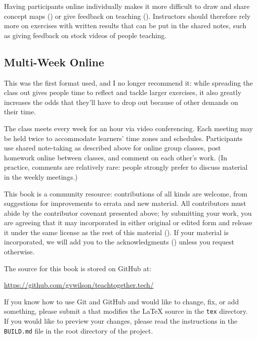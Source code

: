 Having participants online individually makes it more difficult to draw
and share concept maps () or give
feedback on teaching (). Instructors
should therefore rely more on exercises with written results that can be
put in the shared notes, such as giving feedback on stock videos of
people teaching.

\subsection*{Multi-Week Online}

This was the first format used, and I no longer recommend it: while
spreading the class out gives people time to reflect and tackle larger
exercises, it also greatly increases the odds that they'll have to drop
out because of other demands on their time.

The class meets every week for an hour via video conferencing. Each
meeting may be held twice to accommodate learners' time zones and
schedules. Participants use shared note-taking as described above for
online group classes, post homework online between classes, and comment
on each other's work. (In practice, comments are relatively rare: people
strongly prefer to discuss material in the weekly meetings.)


This book is a community resource: contributions of all kinds are
welcome, from suggestions for improvements to errata and new material.
All contributors must abide by the contributor covenant presented above;
by submitting your work, you are agreeing that it may incorporated in
either original or edited form and release it under the same license as
the rest of this material (). If your material is
incorporated, we will add you to the acknowledgments
() unless you request otherwise.

The source for this book is stored on GitHub at:

\begin{center}
  \url{https://github.com/gvwilson/teachtogether.tech/}
\end{center}

\noindent
If you know how to use Git and
GitHub and would like to change, fix, or add something, please
submit a  that modifies the LaTeX
source in the \texttt{tex} directory. If you would like to preview your
changes, please read the instructions in the \texttt{BUILD.md} file in the
root directory of the project.

